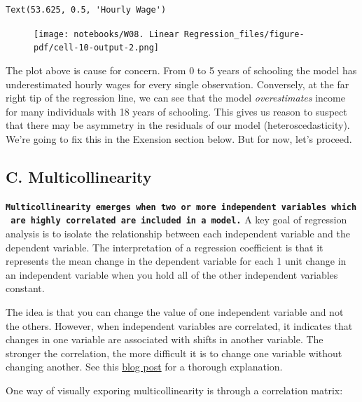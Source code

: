 \documentclass[
  letterpaper,
  DIV=11,
  numbers=noendperiod]{scrreprt}
\begin{document}
\begin{verbatim}
Text(53.625, 0.5, 'Hourly Wage')
\end{verbatim}

\begin{figure}[H]

{\centering \texttt{[image: notebooks/W08. Linear Regression\_files/figure-pdf/cell-10-output-2.png]}

}

\end{figure}

The plot above is cause for concern. From 0 to 5 years of schooling the
model has underestimated hourly wages for every single observation.
Conversely, at the far right tip of the regression line, we can see that
the model \emph{overestimates} income for many individuals with 18 years
of schooling. This gives us reason to suspect that there may be
asymmetry in the residuals of our model (heteroscedasticity). We're
going to fix this in the Exension section below. But for now, let's
proceed.

\hypertarget{c.-multicollinearity}{%
\subsection{C. Multicollinearity}\label{c.-multicollinearity}}

\textbf{\texttt{Multicollinearity\ emerges\ when\ two\ or\ more\ independent\ variables\ which\ are\ highly\ correlated\ are\ included\ in\ a\ model.}}
A key goal of regression analysis is to isolate the relationship between
each independent variable and the dependent variable. The interpretation
of a regression coefficient is that it represents the mean change in the
dependent variable for each 1 unit change in an independent variable
when you hold all of the other independent variables constant.

The idea is that you can change the value of one independent variable
and not the others. However, when independent variables are correlated,
it indicates that changes in one variable are associated with shifts in
another variable. The stronger the correlation, the more difficult it is
to change one variable without changing another. See this
\href{https://statisticsbyjim.com/regression/multicollinearity-in-regression-analysis/}{blog
post} for a thorough explanation.

One way of visually exporing multicollinearity is through a correlation
matrix:
\end{document}
